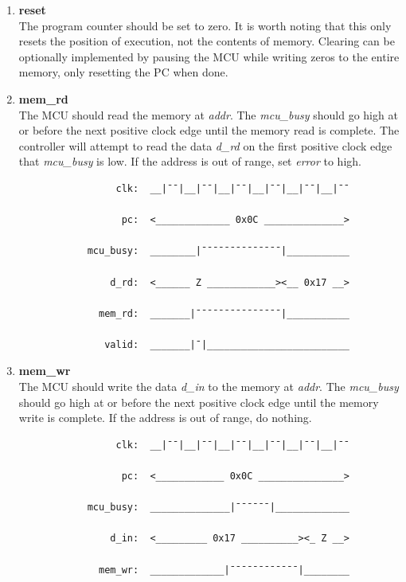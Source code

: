 \documentclass[10pt,a4paper]{article}
\begin{document}
\begin{enumerate}
    \item\textbf{reset}\\
    The program counter should be set to zero. It is worth noting that this only resets the position of
    execution, not the contents of memory. Clearing can be optionally implemented by
    pausing the MCU while writing zeros to the entire memory, only resetting the PC when done.

    \item\textbf{mem\_rd}\\
    The MCU should read the memory at \emph{addr}. The \emph{mcu\_busy} should go
     high at or before the next positive clock edge until the memory read is complete. The
    controller will attempt to read the data \emph{d\_rd} on the first positive clock edge that
    \emph{mcu\_busy} is low. If the address is out of range, set \emph{error} to high.

        \begin{verbatim}
                 clk:  __|¯¯|__|¯¯|__|¯¯|__|¯¯|__|¯¯|__|¯¯

                  pc:  <_____________ 0x0C ______________>

            mcu_busy:  ________|¯¯¯¯¯¯¯¯¯¯¯¯¯¯|___________

                d_rd:  <______ Z ____________><__ 0x17 __>

              mem_rd:  _______|¯¯¯¯¯¯¯¯¯¯¯¯¯¯¯|___________

               valid:  _______|¯|_________________________
        \end{verbatim}

    \newpage
    \item\textbf{mem\_wr}\\
    The MCU should write the data \emph{d\_in} to the memory at \emph{addr}. The \emph{mcu\_busy} should go
    high at or before the next positive clock edge until the memory write is complete.
    If the address is out of range, do nothing.

        \begin{verbatim}
                 clk:  __|¯¯|__|¯¯|__|¯¯|__|¯¯|__|¯¯|__|¯¯

                  pc:  <____________ 0x0C _______________>

            mcu_busy:  ______________|¯¯¯¯¯¯|_____________

                d_in:  <_________ 0x17 __________><_ Z __>

              mem_wr:  _____________|¯¯¯¯¯¯¯¯¯¯¯¯|________


\end{verbatim}
\end{enumerate}
\end{document}
